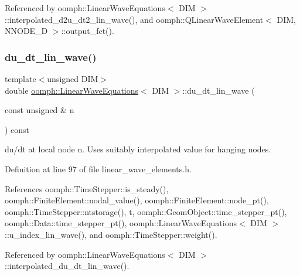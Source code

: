 Referenced by oomph\+::\+Linear\+Wave\+Equations$<$ D\+I\+M $>$\+::interpolated\+\_\+d2u\+\_\+dt2\+\_\+lin\+\_\+wave(), and oomph\+::\+Q\+Linear\+Wave\+Element$<$ D\+I\+M, N\+N\+O\+D\+E\+\_\+D $>$\+::output\+\_\+fct().

\mbox{\label{classoomph_1_1LinearWaveEquations_a207b45abfb3197cabe7f375a458c1a0f}} 
\subsubsection{\texorpdfstring{du\+\_\+dt\+\_\+lin\+\_\+wave()}{du\_dt\_lin\_wave()}}
{\footnotesize\ttfamily template$<$unsigned D\+IM$>$ \\
double \hyperlink{classoomph_1_1LinearWaveEquations}{oomph\+::\+Linear\+Wave\+Equations}$<$ D\+IM $>$\+::du\+\_\+dt\+\_\+lin\+\_\+wave (\begin{DoxyParamCaption}\item[{const unsigned \&}]{n }\end{DoxyParamCaption}) const\hspace{0.3cm}{\ttfamily [inline]}}



du/dt at local node n. Uses suitably interpolated value for hanging nodes. 



Definition at line 97 of file linear\+\_\+wave\+\_\+elements.\+h.



References oomph\+::\+Time\+Stepper\+::is\+\_\+steady(), oomph\+::\+Finite\+Element\+::nodal\+\_\+value(), oomph\+::\+Finite\+Element\+::node\+\_\+pt(), oomph\+::\+Time\+Stepper\+::ntstorage(), t, oomph\+::\+Geom\+Object\+::time\+\_\+stepper\+\_\+pt(), oomph\+::\+Data\+::time\+\_\+stepper\+\_\+pt(), oomph\+::\+Linear\+Wave\+Equations$<$ D\+I\+M $>$\+::u\+\_\+index\+\_\+lin\+\_\+wave(), and oomph\+::\+Time\+Stepper\+::weight().



Referenced by oomph\+::\+Linear\+Wave\+Equations$<$ D\+I\+M $>$\+::interpolated\+\_\+du\+\_\+dt\+\_\+lin\+\_\+wave().

\mbox{\label{classoomph_1_1LinearWaveEquations_a40f640d6f90bc3c4adb88d4aba3effce}} 
